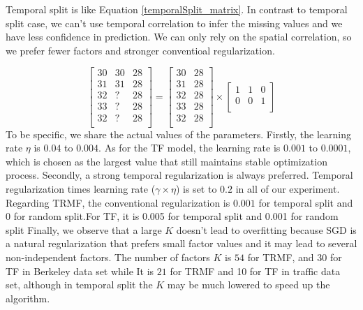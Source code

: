 Temporal split is like Equation \ref{temporalSplit_matrix}.
In contrast to temporal split case, we can't use temporal correlation to infer the missing values and we have less confidence in prediction.
We can only rely on the spatial correlation, so we prefer fewer factors and stronger conventioal regularization.

\begin{equation}
\label{temporalSplit_matrix}
\begin{bmatrix}
30 & 30 & 28\\
31 & 31 & 28\\
32 &  ? & 28\\
33 &  ? & 28\\
32 &  ? & 28\\
\end{bmatrix} 
= 
\begin{bmatrix}
30 & 28\\
31 & 28\\
32 & 28\\
33 & 28\\
32 & 28\\
\end{bmatrix} 
\times
\begin{bmatrix}
1 & 1 & 0\\
0 & 0 & 1\\
\end{bmatrix} 
\end{equation}
To be specific, we share the actual values of the parameters.
Firstly, the learning rate $\eta$ is $0.04$ to $0.004$. As for the TF model, the learning rate is $0.001$ to $0.0001$, which is chosen as the largest value that still maintains stable optimization process.
Secondly, a strong temporal regularization is always preferred.
Temporal regularization times learning rate ($\gamma \times \eta$) is set to $0.2$ in all of our experiment.
Regarding TRMF, the conventional regularization is $0.001$ for temporal split and $0$ for random split.For TF, it is 0.005 for temporal split and 0.001 for random split
Finally, we observe that a large $K$ doesn't lead to overfitting because SGD is a natural regularization that prefers small factor values and it may lead to several non-independent factors.
The number of factors $K$ is $54$ for TRMF, and 30 for TF in Berkeley data set while It is  $21$ for TRMF and 10 for TF in traffic data set, although in temporal split the $K$ may be much lowered to speed up the algorithm. 


